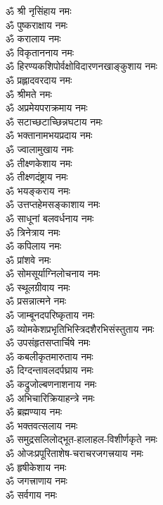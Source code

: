 \begin{multicols}{2}
\begin{flushleft}
ॐ श्री नृसिंहाय नमः\\
ॐ पुष्कराक्षाय नमः\\
ॐ करालाय नमः\\
ॐ विकृताननाय नमः\\
ॐ हिरण्यकशिपोर्वक्षोविदारणनखाङ्कुशाय नमः\\
ॐ प्रह्लादवरदाय नमः\\
ॐ श्रीमते नमः\\
ॐ अप्रमेयपराक्रमाय नमः\\
ॐ सटाच्छटाच्छिन्नघटाय नमः\\
ॐ भक्तानामभयप्रदाय नमः\hfill{}\\
ॐ ज्वालामुखाय नमः\\
ॐ तीक्ष्णकेशाय नमः\\
ॐ तीक्ष्णदंष्ट्राय नमः\\
ॐ भयङ्कराय नमः\\
ॐ उत्तप्तहेमसङ्काशाय नमः\\
ॐ साधूनां बलवर्धनाय नमः\\
ॐ त्रिनेत्राय नमः\\
ॐ कपिलाय नमः\\
ॐ प्रांशवे नमः\\
ॐ सोमसूर्याग्निलोचनाय नमः\hfill{}\\
ॐ स्थूलग्रीवाय नमः\\
ॐ प्रसन्नात्मने नमः\\
ॐ जाम्बूनदपरिष्कृताय नमः\\
ॐ व्योमकेशप्रभृतिभिस्त्रिदशैरभिसंस्तुताय नमः\\
ॐ उपसंहृतसप्तार्चिषे नमः\\
ॐ कबलीकृतमारुताय नमः\\
ॐ दिग्दन्तावलदर्पघ्राय नमः\\
ॐ कद्रुजोल्बणनाशनाय नमः\\
ॐ अभिचारिक्रियाहन्त्रे नमः\\
ॐ ब्रह्मण्याय नमः\hfill{}\\
ॐ भक्तवत्सलाय नमः\\
ॐ समुद्रसलिलोद्भूत-हालाहल-विशीर्णकृते नमः\\
ॐ ओजःप्रपूरिताशेष-चराचरजगत्त्रयाय नमः\\
ॐ हृषीकेशाय नमः\\
ॐ जगत्त्राणाय नमः\\
ॐ सर्वगाय नमः\\

\end{flushleft}
\end{multicols}
